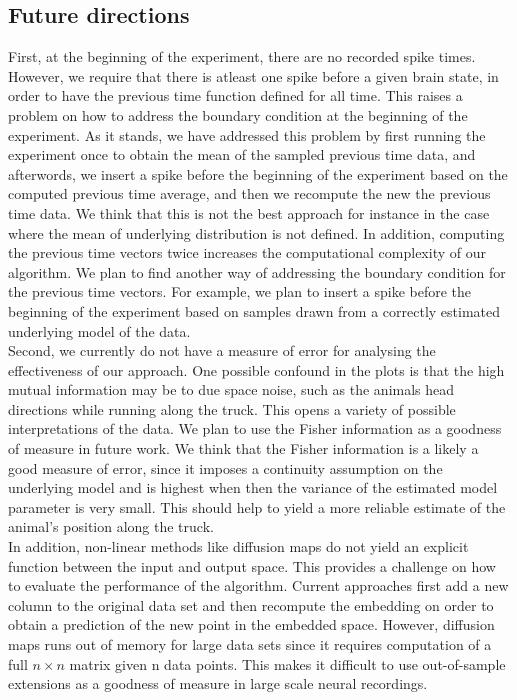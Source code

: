 \subsection{Future directions}
First, at the beginning of the experiment, there are no recorded spike times.
However, we require that there is atleast one spike before a given brain state,
in order to have the previous time function defined for all time.
This raises a problem on how to address the boundary condition at the beginning
of the experiment. As it stands, we have addressed this problem by first running the experiment once to obtain the mean of the sampled previous time data, and afterwords, we insert a spike before the beginning of the experiment based on the computed previous time average, and then we recompute the new the previous time data. We think that this is not the best approach for instance in the case where the mean of underlying distribution is not defined. In addition, computing the previous time vectors twice increases the computational complexity of our algorithm. We plan to find another way of addressing the boundary condition
for the previous time vectors. For example, we plan to insert a spike before the beginning of the experiment based on samples drawn from a correctly estimated underlying model of the data.\\

Second, we currently do not have a measure of error for analysing the  effectiveness of our approach. One possible confound in the plots is that the high  mutual information may be to due space noise, such as the animals head directions while running along the truck. This opens a variety of possible interpretations of the data. We plan to use the Fisher information as a goodness of measure in future work. We think that the Fisher information is a likely a good measure of error, since it imposes a continuity assumption on the underlying model and is highest when then the variance of the estimated model parameter is very small.
This should help to yield a more reliable estimate of the animal's position along the truck. \\

In addition, non-linear methods like diffusion maps do not yield an explicit function between the input and output space. This provides a challenge on how to evaluate the performance of the algorithm. Current approaches first add a new column to the original data set and then recompute the embedding on order to obtain a prediction of the new point in the embedded space. However, diffusion maps runs out of memory for large data sets since it requires computation of a full $n \times n$ matrix given n data points. This makes it difficult to use out-of-sample extensions as a goodness of measure in large scale neural recordings.\\


